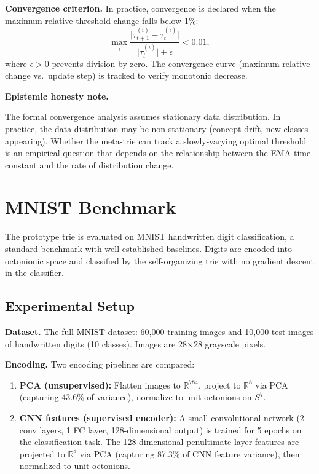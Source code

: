 \documentclass[11pt,a4paper]{article}
\theoremstyle{definition}
\theoremstyle{remark}
\newcommand{\Real}{\mathbb{R}}
\newenvironment{epistemicnote}{%
  \medskip\noindent\textbf{Epistemic honesty note.}\itshape\space
}{%
  \medskip
}
\begin{document}
\textbf{Convergence criterion.} In practice, convergence is declared when the maximum relative threshold change falls below 1\%:
\begin{equation}
  \max_i \frac{\lvert \tau_{t+1}^{(i)} - \tau_t^{(i)} \rvert}{\lvert \tau_t^{(i)} \rvert + \epsilon} < 0.01,
\end{equation}
where $\epsilon > 0$ prevents division by zero. The convergence curve (maximum relative change vs.\ update step) is tracked to verify monotonic decrease.

\begin{epistemicnote}
The formal convergence analysis assumes stationary data distribution. In practice, the data distribution may be non-stationary (concept drift, new classes appearing). Whether the meta-trie can track a slowly-varying optimal threshold is an empirical question that depends on the relationship between the EMA time constant and the rate of distribution change.
\end{epistemicnote}

\section{MNIST Benchmark}
\label{sec:mnist}

The prototype trie is evaluated on MNIST handwritten digit classification, a standard benchmark with well-established baselines. Digits are encoded into octonionic space and classified by the self-organizing trie with no gradient descent in the classifier.

\subsection{Experimental Setup}

\textbf{Dataset.} The full MNIST dataset: 60,000 training images and 10,000 test images of handwritten digits (10 classes). Images are 28$\times$28 grayscale pixels.

\textbf{Encoding.} Two encoding pipelines are compared:
\begin{enumerate}[nosep]
  \item \textbf{PCA (unsupervised):} Flatten images to $\Real^{784}$, project to $\Real^{8}$ via PCA (capturing 43.6\% of variance), normalize to unit octonions on $S^7$.
  \item \textbf{CNN features (supervised encoder):} A small convolutional network (2 conv layers, 1 FC layer, 128-dimensional output) is trained for 5 epochs on the classification task. The 128-dimensional penultimate layer features are projected to $\Real^{8}$ via PCA (capturing 87.3\% of CNN feature variance), then normalized to unit octonions.
\end{enumerate}
\end{document}
